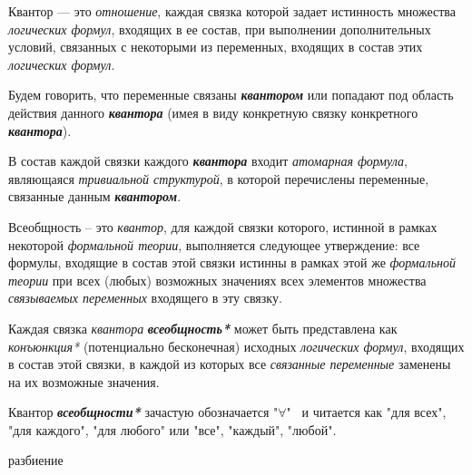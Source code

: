 Квантор — это \textit{отношение}, каждая связка которой задает истинность множества \textit{логических формул}, входящих в ее состав, при выполнении дополнительных условий, связанных с некоторыми из переменных, входящих в состав этих \textit{логических формул}.

Будем говорить, что переменные связаны \textbf{\textit{квантором}} или попадают под область действия данного \textbf{\textit{квантора}} (имея в виду конкретную связку конкретного \textbf{\textit{квантора}}).

В состав каждой связки каждого \textbf{\textit{квантора}} входит \textit{атомарная формула}, являющаяся \textit{тривиальной структурой}, в которой перечислены переменные, связанные данным \textbf{\textit{квантором}}.

\begin{SCn}
\end{SCn}

Всеобщность -- это \textit{квантор}, для каждой связки которого, истинной в рамках некоторой \textit{формальной теории}, выполняется следующее утверждение: все формулы, входящие в состав этой связки истинны в рамках этой же \textit{формальной теории} при всех (любых) возможных значениях всех элементов множества \textit{связываемых переменных\scnrolesign} входящего в эту связку.

Каждая связка \textit{квантора} \textbf{\textit{всеобщность*}} может быть представлена как \textit{конъюнкция*} (потенциально бесконечная) исходных \textit{логических формул}, входящих в состав этой связки, в каждой из которых все \textit{связанные переменные\scnrolesign} заменены на их возможные значения.

Квантор \textbf{\textit{всеобщности*}} зачастую обозначается "$\forall$" \ и читается как "для всех"{}, "для каждого"{}, "для любого"{} или "все"{}, "каждый"{}, "любой".


\begin{SCn}
\begin{scnreltoset}{разбиение}
\end{scnreltoset}

\end{SCn}

